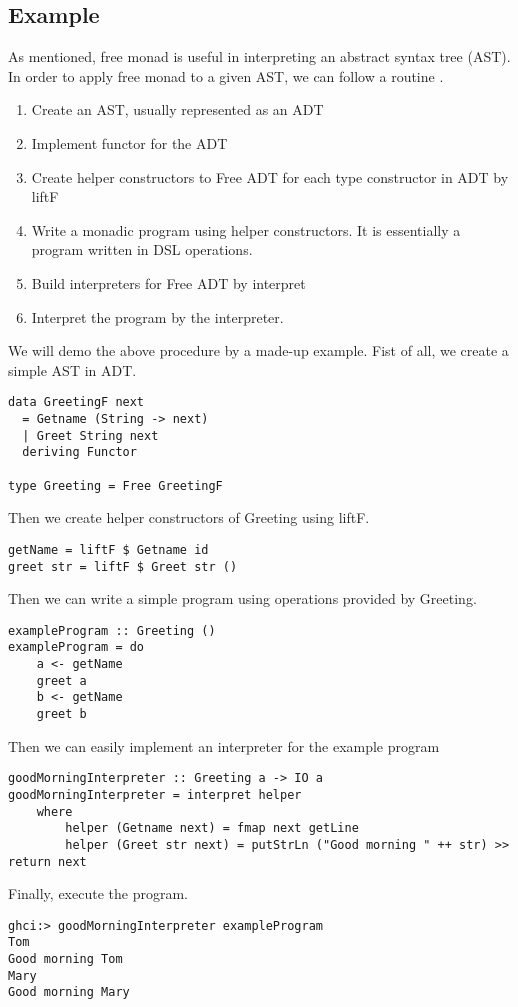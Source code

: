 \subsection{Example} \label{b:fm:e}
As mentioned, free monad is useful in interpreting an abstract syntax tree (AST). In order to apply free monad to a given AST, we can follow a routine \cite{contributorsCatsFreeMonads}.
\begin{enumerate}
  \item Create an AST, usually represented as an ADT
  \item Implement functor for the ADT
  \item Create helper constructors to Free ADT for each type constructor in ADT by liftF 
  \item Write a monadic program using helper constructors. It is essentially a program written in DSL operations.
  \item Build interpreters for Free ADT by interpret
  \item Interpret the program by the interpreter.
\end{enumerate}
We will demo the above procedure by a made-up example. Fist of all, we create a simple AST in ADT. 
\begin{verbatim}
data GreetingF next
  = Getname (String -> next)
  | Greet String next
  deriving Functor

type Greeting = Free GreetingF
\end{verbatim}
Then we create helper constructors of Greeting using liftF.
\begin{verbatim}
getName = liftF $ Getname id
greet str = liftF $ Greet str ()
\end{verbatim}
Then we can write a simple program using operations provided by Greeting.
\begin{verbatim}
exampleProgram :: Greeting ()
exampleProgram = do
    a <- getName
    greet a
    b <- getName
    greet b
\end{verbatim}
Then we can easily implement an interpreter for the example program
\begin{verbatim}
goodMorningInterpreter :: Greeting a -> IO a
goodMorningInterpreter = interpret helper
    where
        helper (Getname next) = fmap next getLine
        helper (Greet str next) = putStrLn ("Good morning " ++ str) >> return next  
\end{verbatim} 
Finally, execute the program.
\begin{verbatim}
ghci:> goodMorningInterpreter exampleProgram
Tom
Good morning Tom
Mary
Good morning Mary
\end{verbatim}

